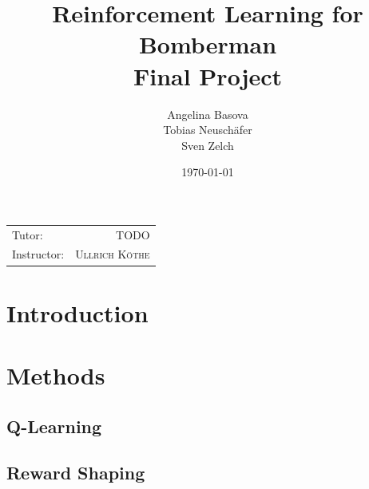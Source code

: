 \documentclass[
	letterpaper, %
	10pt, %
]{CSUniSchoolLabReport}
\title{\textbf{Reinforcement Learning for Bomberman \\ Final Project}} %
\author{Angelina Basova \\ Tobias Neuschäfer \\Sven Zelch} %
\date{\today} %
\begin{document}
\maketitle %

\begin{center}
	\begin{tabular}{l r}
		Tutor:      & TODO                     \\
		Instructor: & \textsc{Ullrich K\"othe} %
	\end{tabular}
\end{center}



\newpage

\tableofcontents
\newpage

\listoffigures
\listoftables
\newpage



\section{Introduction}


\section{Methods}

\subsection{Q-Learning}
\subsection{Reward Shaping}

\end{document}
